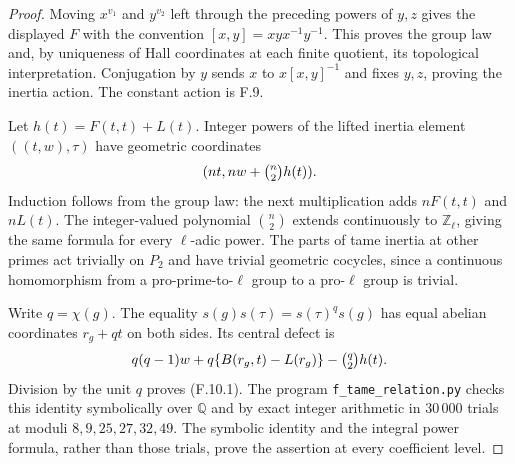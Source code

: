 \begin{proof}
Moving $x^{v_1}$ and $y^{v_2}$ left through the preceding powers
of $y,z$ gives the displayed $F$ with the convention
$[x,y]=xyx^{-1}y^{-1}$. This proves the group law and,
by uniqueness of Hall coordinates at each finite quotient,
its topological interpretation. Conjugation by $y$ sends
$x$ to $x[x,y]^{-1}$ and fixes $y,z$, proving the inertia action.
The constant action is F.9.

Let $h(t)=F(t,t)+L(t)$. Integer powers of the lifted inertia element
$((t,w),\tau)$ have geometric coordinates
\[
 (nt,nw+\tbinom n2h(t)).
\]
Induction follows from the group law: the next multiplication adds
$nF(t,t)$ and $nL(t)$. The integer-valued polynomial
$\binom n2$ extends continuously to $\mathbb Z_\ell$, giving the same
formula for every $\ell$-adic power. The parts of tame inertia at
other primes act trivially on $P_2$ and have trivial geometric
cocycles, since a continuous homomorphism from a pro-prime-to-$\ell$
group to a pro-$\ell$ group is trivial.

Write $q=\chi(g)$. The equality
$s(g)s(\tau)=s(\tau)^q s(g)$ has equal abelian coordinates
$r_g+qt$ on both sides. Its central defect is
\[
 q(q-1)w+q\{B(r_g,t)-L(r_g)\}
             -\tbinom q2h(t).
\]
Division by the unit $q$ proves (F.10.1).
The program \texttt{f\_tame\_relation.py} checks this identity
symbolically over $\mathbb Q$ and by exact integer arithmetic
in $30\,000$ trials at moduli $8,9,25,27,32,49$.
The symbolic identity and the integral power formula, rather
than those trials, prove the assertion at every coefficient level.
\end{proof}


